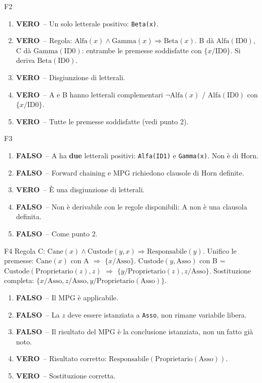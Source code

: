 \documentclass[12pt,a4paper]{article}
\newcommand{\V}{\textcolor{green!60!black}{\textbf{VERO}}}
\newcommand{\F}{\textcolor{red!70!black}{\textbf{FALSO}}}
\begin{document}
\begin{risposta}{F2}
\begin{enumerate}[noitemsep, label=\arabic*.]
  \item \V\ -- Un solo letterale positivo: \texttt{Beta(x)}.
  \item \V\ -- Regola: $\text{Alfa}(x) \land \text{Gamma}(x) \Rightarrow \text{Beta}(x)$. B dà $\text{Alfa}(\text{ID0})$, C dà $\text{Gamma}(\text{ID0})$: entrambe le premesse soddisfatte con $\{x/\text{ID0}\}$. Si deriva $\text{Beta}(\text{ID0})$.
  \item \V\ -- Disgiunzione di letterali.
  \item \V\ -- A e B hanno letterali complementari $\neg\text{Alfa}(x)$ / $\text{Alfa}(\text{ID0})$ con $\{x/\text{ID0}\}$.
  \item \V\ -- Tutte le premesse soddisfatte (vedi punto 2).
\end{enumerate}
\end{risposta}

\begin{risposta}{F3}
\begin{enumerate}[noitemsep, label=\arabic*.]
  \item \F\ -- A ha \textbf{due} letterali positivi: \texttt{Alfa(ID1)} e \texttt{Gamma(x)}. Non è di Horn.
  \item \F\ -- Forward chaining e MPG richiedono clausole di Horn definite.
  \item \V\ -- È una disgiunzione di letterali.
  \item \F\ -- Non è derivabile con le regole disponibili: A non è una clausola definita.
  \item \F\ -- Come punto 2.
\end{enumerate}
\end{risposta}

\begin{risposta}{F4}
Regola C: $\text{Cane}(x) \land \text{Custode}(y, x) \Rightarrow \text{Responsabile}(y)$. Unifico le premesse:
$\text{Cane}(x)$ con A $\Rightarrow$ $\{x/\text{Asso}\}$.
$\text{Custode}(y, \text{Asso})$ con B = $\text{Custode}(\text{Proprietario}(z), z)$ $\Rightarrow$ $\{y/\text{Proprietario}(z), z/\text{Asso}\}$.
Sostituzione completa: $\{x/\text{Asso}, z/\text{Asso}, y/\text{Proprietario}(\text{Asso})\}$.
\begin{enumerate}[noitemsep, label=\arabic*.]
  \item \F\ -- Il MPG è applicabile.
  \item \F\ -- La $z$ deve essere istanziata a \texttt{Asso}, non rimane variabile libera.
  \item \F\ -- Il risultato del MPG è la conclusione istanziata, non un fatto già noto.
  \item \V\ -- Risultato corretto: $\text{Responsabile}(\text{Proprietario}(\text{Asso}))$.
  \item \V\ -- Sostituzione corretta.
\end{enumerate}
\end{risposta}
\end{document}
